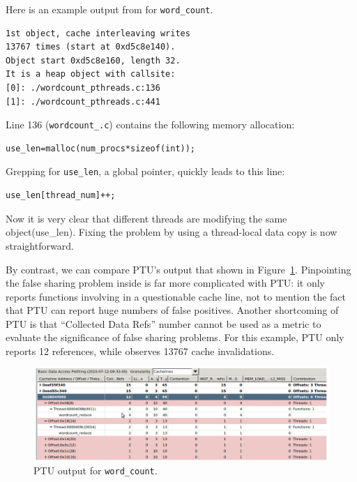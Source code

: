 Here is an example output from \sheriffdetect{} for \texttt{word\_count}.

\begin{verbatim} 
1st object, cache interleaving writes 
13767 times (start at 0xd5c8e140). 
Object start 0xd5c8e160, length 32. 
It is a heap object with callsite:
[0]: ./wordcount_pthreads.c:136
[1]: ./wordcount_pthreads.c:441
\end{verbatim}

Line 136 (\texttt{wordcount\_\pthreads{}.c}) contains the following memory allocation:

\begin{verbatim}
use_len=malloc(num_procs*sizeof(int));
\end{verbatim}

Grepping for \texttt{use\_len}, a global pointer, quickly leads to this line:

\begin{verbatim}
use_len[thread_num]++;
\end{verbatim}

Now it is very clear that different threads are modifying the same object(use\_len). Fixing the problem by using a thread-local data copy is now straightforward.

By contrast, we can compare PTU's output that shown in Figure~\ref{fig:wordcount}. Pinpointing the false sharing problem inside is far more complicated with PTU: it only reports functions involving in a questionable cache line, not to mention the fact that PTU can report huge numbers of false positives.  Another shortcoming of PTU is that ``Collected Data Refs'' number cannot be used as a metric to evaluate the significance of false sharing problems. For this example, PTU only reports 12 references, while \sheriffdetect{} observes 13767 cache invalidations.

\begin{figure}[!t]
\centering
\includegraphics[width=6in]{sheriff/figure/wordcount}
\caption{PTU output for \texttt{word\_count}.
\label{fig:wordcount}}
\end{figure}

